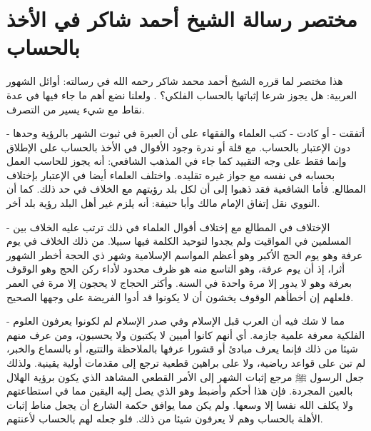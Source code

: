 \section{مختصر رسالة الشيخ أحمد شاكر في الأخذ بالحساب}
\label{sec:app_shuhur_ahmidShakir}

هذا مختصر لما قرره الشيخ أحمد محمد شاكر رحمه الله في رسالته: أوائل الشهور العربية: هل يجوز شرعا إثباتها بالحساب الفلكي؟ \cite{shuhur_ahmidShakir}.  ولعلنا نضع أهم ما جاء فيها في عدة نقاط مع شيء يسير من التصرف.

- أتفقت - أو كادت - كتب العلماء والفقهاء على أن العبرة في ثبوت الشهر بالرؤية وحدها دون الإعتبار بالحساب. مع قلة أو ندرة وجود الأقوال في الأخذ بالحساب على الإطلاق وإنما فقط على وجه التقييد كما جاء في المذهب الشافعي: أنه يجوز للحاسب العمل بحسابه في نفسه مع جواز غيره تقليده. واختلف العلماء أيضا في الإعتبار بإختلاف المطالع. فأما الشافعية فقد ذهبوا إلى أن لكل بلد رؤيتهم مع الخلاف في حد ذلك. كما أن النووي نقل إتفاق الإمام مالك وأبا حنيفة: أنه يلزم غير أهل البلد رؤية بلد أخر.

- الإختلاف في المطالع مع إختلاف أقوال العلماء في ذلك ترتب عليه الخلاف بين المسلمين في المواقيت ولم يجدوا لتوحيد الكلمة فيها سبيلا. من ذلك الخلاف في يوم عرفة وهو يوم الحج الأكبر وهو أعظم المواسم الإسلامية وشهر ذي الحجة أخطر الشهور أثرا، إذ أن يوم عرفة، وهو التاسع منه هو ظرف محدود لأداء ركن الحج وهو الوقوف بعرفة وهو لا يدور إلا مرة واحدة في السنة. وأكثر الحجاج لا يحجون إلا مرة في العمر فلعلهم إن أخطأهم الوقوف يخشون أن لا يكونوا قد أدوا الفريضة على وجهها الصحيح.

- مما لا شك فيه أن العرب قبل الإسلام وفي صدر الإسلام لم لكونوا يعرفون العلوم الفلكية معرفة علمية جازمة. أي أنهم كانوا أميين لا يكتبون ولا يحسبون، ومن عرف منهم شيئا من ذلك فإنما يعرف مبادئ أو قشورا عرفها بالملاحظة والتتبع، أو بالسماع والخبر، لم تبن على قواعد رياضية، ولا على براهين قطعية ترجع إلى مقدمات أولية يقينية. ولذلك جعل الرسول ﷺ مرجع إثبات الشهر إلى الأمر القطعي المشاهد الذي يكون برؤية الهلال بالعين المجردة. فإن هذا أحكم وأضبط وهو الذي يصل إليه اليقين مما في استطاعتهم ولا يكلف الله نفسا إلا وسعها. ولم يكن مما يوافق حكمة الشارع أن يجعل مناط إثبات الأهلة بالحساب وهم لا يعرفون شيئا من ذلك. فلو جعله لهم بالحساب لأعنتهم.

